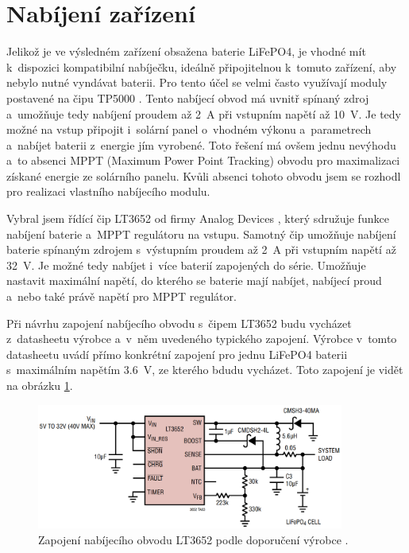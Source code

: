 \section{Nabíjení zařízení}

Jelikož je ve výsledném zařízení obsažena baterie LiFePO4, je vhodné mít k~dispozici kompatibilní nabíječku, ideálně připojitelnou k~tomuto zařízení, aby nebylo nutné vyndávat baterii. Pro tento účel se velmi často využívají moduly postavené na čipu TP5000 \cite{dat_TP5000}. Tento nabíjecí obvod má uvnitř spínaný zdroj a~umožňuje tedy nabíjení proudem až \SI{2}{\ampere} při vstupním napětí až \SI{10}{\volt}. Je tedy možné na vstup připojit i~solární panel o~vhodném výkonu a~parametrech a~nabíjet baterii z~energie jím vyrobené. Toto řešení má ovšem jednu nevýhodu a~to absenci MPPT (Maximum Power Point Tracking) obvodu pro maximalizaci získané energie ze solárního panelu. Kvůli absenci tohoto obvodu jsem se rozhodl pro realizaci vlastního nabíjecího modulu.

Vybral jsem řídící čip LT3652 od firmy Analog Devices \cite{dat_LT3652}, který sdružuje funkce nabíjení baterie a~MPPT regulátoru na vstupu. Samotný čip umožňuje nabíjení baterie spínaným zdrojem s~výstupním proudem až \SI{2}{\ampere} při vstupním napětí až \SI{32}{\volt}. Je možné tedy nabíjet i~více baterií zapojených do série. Umožňuje nastavit maximální napětí, do kterého se baterie mají nabíjet, nabíjecí proud a~nebo také právě napětí pro MPPT regulátor.

Při návrhu zapojení nabíjecího obvodu s~čipem LT3652 budu vycházet z~datasheetu výrobce \cite{dat_LT3652} a~v~něm uvedeného typického zapojení. Výrobce v~tomto datasheetu uvádí přímo konkrétní zapojení pro jednu LiFePO4 baterii s~maximálním napětím \SI{3.6}{\volt}, ze kterého bdudu vycházet. Toto zapojení je vidět na obrázku \ref{fig_datasheetSchematicLT3652}.

\begin{figure}[h]
    \centering
    \includegraphics[width=0.9\textwidth]{obrazky/datasheetSchematicLT3652.png}
    \caption{Zapojení nabíjecího obvodu LT3652 podle doporučení výrobce \cite{dat_LT3652}.}
    \label{fig_datasheetSchematicLT3652}
\end{figure}


